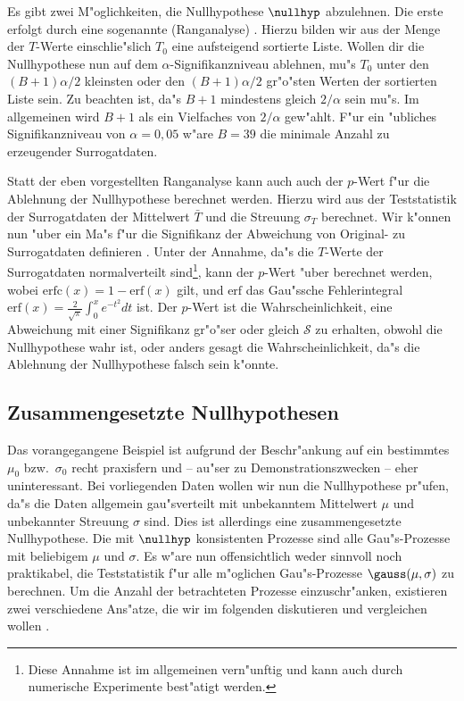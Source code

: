 Es gibt zwei M"oglichkeiten, die Nullhypothese $\nullhyp$ abzulehnen. Die erste erfolgt
durch eine sogenannte \begriff(Ranganalyse) \cite{Prichard-theiler3}.  Hierzu bilden wir
aus der Menge der $T$-Werte einschlie"slich $T_0$ eine aufsteigend sortierte Liste.
Wollen dir die Nullhypothese nun auf dem $\alpha$-Signifikanzniveau ablehnen, mu"s $T_0$
unter den $(B+1)\alpha/2$ kleinsten oder den $(B+1)\alpha/2$ gr"o"sten Werten der
sortierten Liste sein. Zu beachten ist, da"s $B+1$ mindestens gleich $2/\alpha$ sein mu"s.
Im allgemeinen wird $B+1$ als ein Vielfaches von $2/\alpha$ gew"ahlt. F"ur ein "ubliches
Signifikanzniveau von $\alpha=0,05$ w"are $B=39$ die minimale Anzahl zu erzeugender 
Surrogatdaten.

Statt der eben vorgestellten Ranganalyse kann auch auch der $p$-Wert f"ur die Ablehnung der
Nullhypothese berechnet werden. Hierzu wird aus der Teststatistik der Surrogatdaten der
Mittelwert $\bar T$ und die Streuung $\sigma_T$ berechnet. Wir k"onnen nun "uber
ein Ma"s f"ur die Signifikanz der Abweichung von Original- zu Surrogatdaten definieren
\cite{Theiler92b}. Unter der Annahme, da"s die $T$-Werte der Surrogatdaten normalverteilt
sind\footnote{Diese Annahme ist im allgemeinen vern"unftig und kann auch durch numerische
  Experimente best"atigt werden.}, kann der $p$-Wert "uber 
berechnet werden, wobei
  $\mathrm{erfc}(x)=1-\mathrm{erf}(x)$ gilt, und $\mathrm{erf}$ das Gau"ssche Fehlerintegral
  $\mathrm{erf}(x)=\frac2{\sqrt{\pi}}\int_0^xe^{-t^2} dt$ ist.  Der $p$-Wert ist die
Wahrscheinlichkeit, eine Abweichung mit einer Signifikanz gr"o"ser oder gleich $\mathcal{S}$ zu erhalten, obwohl
die Nullhypothese wahr ist, oder anders gesagt die Wahrscheinlichkeit, da"s die Ablehnung
der Nullhypothese falsch sein k"onnte.


\subsection{Zusammengesetzte Nullhypothesen}
Das vorangegangene Beispiel ist aufgrund der Beschr"ankung auf ein bestimmtes $\mu_0$
bzw.\ $\sigma_0$ recht praxisfern und -- au"ser zu Demonstrationszwecken -- eher
uninteressant. Bei vorliegenden Daten wollen wir nun die Nullhypothese pr"ufen, da"s die Daten
allgemein gau"sverteilt mit unbekanntem Mittelwert $\mu$ und unbekannter Streuung
$\sigma$ sind. Dies ist allerdings eine zusammengesetzte Nullhypothese. Die mit
$\nullhyp$ konsistenten Prozesse sind alle Gau"s-Prozesse mit beliebigem $\mu$ und
$\sigma$. Es w"are nun offensichtlich weder sinnvoll noch praktikabel, die Teststatistik
 f"ur alle m"oglichen Gau"s-Prozesse $\gauss(\mu,\sigma)$ zu
berechnen. Um die Anzahl der betrachteten Prozesse einzuschr"anken, existieren zwei
verschiedene Ans"atze, die wir im folgenden diskutieren und vergleichen wollen
\cite{Prichard-theiler3}.

